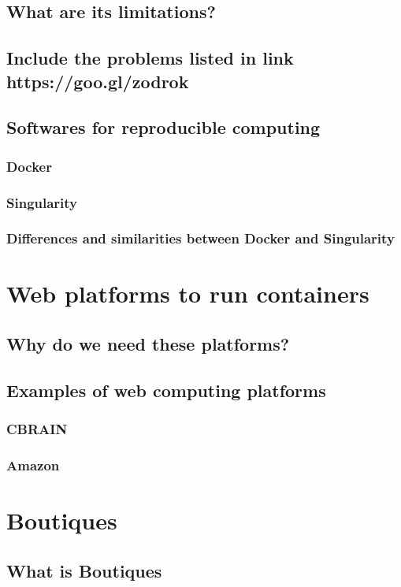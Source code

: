 \subsection{What are its limitations?}
\subsection{Include the problems listed in link https://goo.gl/zodrok}
\subsection{Softwares for reproducible computing}
\subsubsection{Docker}
\subsubsection{Singularity}
\subsubsection{Differences and similarities between Docker and Singularity}

\section{Web platforms to run containers}
\subsection{Why do we need these platforms?}
\subsection{Examples of web computing platforms}
\subsubsection{CBRAIN}
\subsubsection{Amazon}

\section{Boutiques}
\subsection{What is Boutiques}
